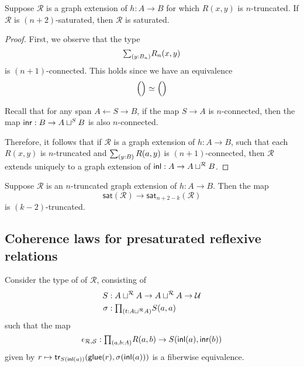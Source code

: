 \begin{thm}
Suppose $\mathcal{R}$ is a graph extension of $h:A\to B$ for which $R(x,y)$ is $n$-truncated. If $\mathcal{R}$ is $(n+2)$-saturated, then $\mathcal{R}$ is saturated.
\end{thm}

\begin{proof}
First, we observe that the type
\begin{equation*}
\sm{y:B_n}R_{n}(x,y)
\end{equation*}
is $(n+1)$-connected. This holds since we have an equivalence
\begin{equation*}
\eqv{\Big(\Big)}{\Big(\Big)}
\end{equation*}

Recall that for any span $A \leftarrow S \rightarrow B$, if the map $S\to A$ is $n$-connected, then the map ${\mathsf{inr}}:B\to A\sqcup^S B$ is also $n$-connected.

Therefore, it follows that if $\mathcal{R}$ is a graph extension of $h:A\to B$, such that each $R(x,y)$ is $n$-truncated and $\sm{y:B}R(a,y)$ is $(n+1)$-connected, then $\mathcal{R}$ extends uniquely to a graph extension of ${\mathsf{inl}}:A\to A\sqcup^{\mathcal{R}} B$.
\end{proof}

\begin{conj}
Suppose $\mathcal{R}$ is an $n$-truncated graph extension of $h:A\to B$. Then the map
\begin{equation*}
\mathsf{sat}(\mathcal{R})\to \mathsf{sat}_{n+2-k}(\mathcal{R})
\end{equation*}
is $(k-2)$-truncated.
\end{conj}

\subsection{Coherence laws for presaturated reflexive relations}
Consider the type of  of $\mathcal{R}$, consisting of
\begin{align*}
S & : A\sqcup^{\mathcal{R}}A \to A\sqcup^{\mathcal{R}} A \to \UU \\
\sigma & : \prd{t:A\sqcup^{\mathcal{R}} A} S(a,a)
\end{align*}
such that the map
\begin{equation*}
\epsilon_{\mathcal{R},\mathcal{S}} : \prd{a,b:A}R(a,b)\to S(\inl(a),\inr(b))
\end{equation*}
given by $r\mapsto \mathsf{tr}_{S({\mathsf{inl}}(a))}(\mathsf{glue}(r),\sigma({\mathsf{inl}}(a)))$ is a fiberwise equivalence.

